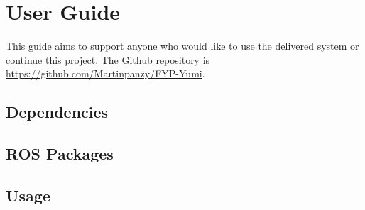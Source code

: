 \chapter{User Guide}
This guide aims to support anyone who would like to use the delivered system or continue this project. The Github repository is \url{https://github.com/Martinpanzy/FYP-Yumi}.

\section{Dependencies}
\section{ROS Packages}

\section{Usage}

